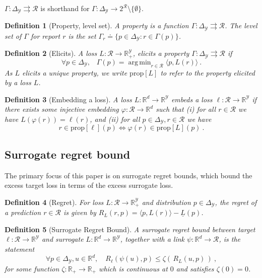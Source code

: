 \documentclass[12pt]{article}
\newcommand{\reals}{\mathbb{R}}
\newcommand{\defeq}{\doteq}%
\newcommand{\prop}[1]{\mathrm{prop}[#1]}
\newcommand{\simplex}{\Delta_\Y}
\newcommand{\R}{\mathcal{R}}
\newcommand{\Y}{\mathcal{Y}}
\newcommand{\risk}[1]{\underline{#1}}
\newcommand{\inprod}[2]{\langle #1, #2 \rangle}%
\newcommand{\toto}{\rightrightarrows}
\DeclareMathOperator*{\argmin}{arg\,min}
\newtheorem{definition}{Definition}
\begin{document}
$\Gamma: \simplex \toto \R$ is shorthand for $\Gamma: \simplex \to 2^{\R} \setminus \{\emptyset\}$.

\begin{definition}[Property, level set]\label{def:property}
  A \emph{property} is a function $\Gamma:\simplex\toto\R$.
  The \emph{level set} of $\Gamma$ for report $r$ is the set $\Gamma_r \defeq \{p \in \simplex : r \in \Gamma(p)\}$.
\end{definition}

\begin{definition}[Elicits]
  \label{def:elicits}
  A loss $L:\R\to\reals^\Y_+$, \emph{elicits} a property $\Gamma:\simplex \toto \R$ if
  \begin{equation}
    \forall p\in\simplex,\;\;\;\Gamma(p) = \argmin_{r \in \R} \inprod{p}{L(r)}~.
  \end{equation}
  As $L$ elicits a unique property, we write $\prop{L}$ to refer to the property elicited by a loss $L$.
\end{definition}

\begin{definition}[Embedding a loss]\label{def:loss-embed}
  A loss $L:\reals^d\to\reals^\Y$ \emph{embeds} a loss $\ell:\R\to\reals^\Y$ if there exists some injective embedding $\varphi:\R\to\reals^d$ such that
  (i) for all $r\in\R$ we have $L(\varphi(r)) = \ell(r)$, and (ii) for all $p\in\simplex,r\in\R$ we have
  \begin{equation}\label{eq:embed-loss}
    r \in \prop{\ell}(p) \iff \varphi(r) \in \prop{L}(p)~.
  \end{equation}
\end{definition}
%


\subsection{Surrogate regret bound}

The primary focus of this paper is on surrogate regret bounds, which bound the excess target loss in terms of the excess surrogate loss.

\begin{definition}[Regret]\label{def:regret}
  For loss $L:\R\to\reals^\Y_+$ and distribution $p\in\simplex$, the \emph{regret} of a prediction $r\in\R$ is given by $R_L(r,p) = \inprod{p}{L(r)} - \risk{L}(p)$.
\end{definition}

\begin{definition}[Surrogate Regret Bound]\label{def:regret-bound}
  A \emph{surrogate regret bound} between target $\ell:\R\to\reals^\Y$ and surrogate $L:\reals^d\to\reals^\Y$, together with a link $\psi : \reals^d \to \R$, is the statement
  \begin{equation}
    \label{eq:regret-bound-general}
    \forall p\in\simplex, u\in\reals^d, \quad R_\ell(\psi(u),p) \leq \zeta(\, R_L(u,p) \,)~,
  \end{equation}
  for some function $\zeta : \reals_+ \to \reals_+$ which is continuous at $0$ and satisfies $\zeta(0) = 0$.
\end{definition}
\end{document}
